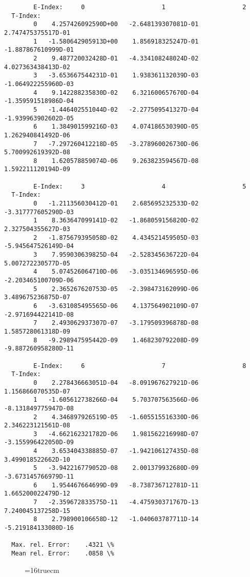 \documentclass[12pt,dvipdfmx]{article}
\begin{document}
{\begin{small}
\begin{verbatim}
        E-Index:     0                     1                     2
  T-Index:
        0    4.257426092590D+00   -2.648139307081D-01    2.747475375517D-01
        1   -1.580642905913D+00    1.856918325247D-01   -1.887867610999D-01
        2    9.487720032428D-01   -4.334108248024D-02    4.027363438413D-02
        3   -3.653667544231D-01    1.938361132039D-03   -1.064922255960D-03
        4    9.142288235830D-02    6.321600657670D-04   -1.359591518986D-04
        5   -1.446402551044D-02   -2.277509541327D-04   -1.939963902602D-05
        6    1.384901599216D-03    4.074186530390D-05    1.262940841492D-06
        7   -7.297260412218D-05   -3.278960026730D-06    5.700992619392D-08
        8    1.620578859074D-06    9.263823594567D-08    1.592211120194D-09

        E-Index:     3                     4                     5
  T-Index:
        0   -1.211356030412D-01    2.685695232533D-02   -3.317777605290D-03
        1    8.363647099141D-02   -1.868059156820D-02    2.327504355627D-03
        2   -1.875679395058D-02    4.434521459505D-03   -5.945647526149D-04
        3    7.959030639825D-04   -2.528345636722D-04    5.007272230577D-05
        4    5.074526064710D-06   -3.035134696595D-06   -2.203465100709D-06
        5    2.365267620753D-05   -2.398473162099D-06    3.489675236875D-07
        6   -3.631085495565D-06    4.137564902109D-07   -2.971694422141D-08
        7    2.493062937307D-07   -3.179509396878D-08    1.585728061318D-09
        8   -9.298947595442D-09    1.468230792208D-09   -9.887260958280D-11

        E-Index:     6                     7                     8
  T-Index:
        0    2.278436663051D-04   -8.091967627921D-06    1.156866070535D-07
        1   -1.605612738266D-04    5.703707563566D-06   -8.131849775947D-08
        2    4.346897926519D-05   -1.605515516330D-06    2.346223121561D-08
        3   -4.662162321782D-06    1.981562216998D-07   -3.155996422050D-09
        4    3.653404338885D-07   -1.942106127435D-08    3.499018522662D-10
        5   -3.942216779052D-08    2.001379932680D-09   -3.673145766979D-11
        6    1.954467664699D-09   -8.738736712781D-11    1.665200022479D-12
        7   -2.359672833575D-11   -4.475930371767D-13    7.240045137258D-15
        8    2.798900106658D-12   -1.040603787711D-14   -5.219184133080D-16

  Max. rel. Error:    .4321 \%
  Mean rel. Error:    .0858 \%

\end{verbatim}\end{small}
\begin{figure} \label{2.1.5li2o}
\epsfxsize=16truecm
\end{figure}
\newpage

}
\end{document}
